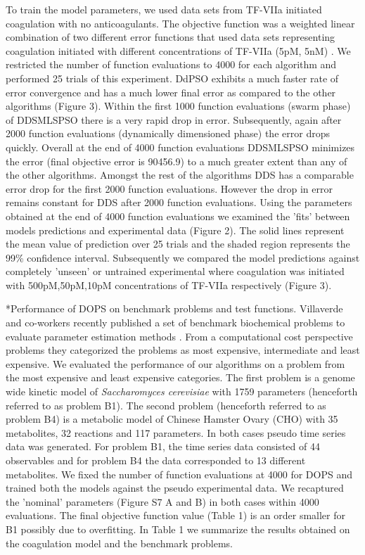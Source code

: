 \documentclass[12pt]{article}
\makeatletter
\renewcommand\subsection{\@startsection
	{subsection}{2}{0mm}
	{-0.05in}
	{-0.5\baselineskip}
	{\normalfont\normalsize\bfseries}}
\makeatother
\begin{document}
 To train the model parameters, we used data sets from TF-VIIa initiated coagulation with no anticoagulants. The objective function was a weighted linear combination of two different error functions that used data sets representing coagulation initiated with different concentrations of TF-VIIa (5pM, 5nM) \cite{hockin2002model}. We restricted the number of function evaluations to 4000 for each algorithm and performed 25 trials of this experiment. DdPSO exhibits a much faster rate of error convergence and has a much lower final error as compared to the other algorithms (Figure 3). Within the first 1000 function evaluations (swarm phase) of DDSMLSPSO there is a very rapid drop in error. Subsequently, again after 2000 function evaluations (dynamically dimensioned phase) the error drops quickly. Overall at the end of 4000 function evaluations DDSMLSPSO minimizes the error (final objective error is 90456.9) to a much greater extent than any of the other algorithms. Amongst the rest of the algorithms DDS has a comparable error drop for the first 2000 function evaluations. However the drop in error remains constant for DDS after 2000 function evaluations. Using the parameters obtained at the end of 4000 function evaluations we examined the 'fits' between models predictions and experimental data (Figure 2). The solid lines represent the mean value of prediction over 25 trials and the shaded region represents the 99\% confidence interval. Subsequently we compared the model predictions against completely 'unseen' or untrained experimental where coagulation was initiated with 500pM,50pM,10pM concentrations of TF-VIIa respectively (Figure 3).


\subsection*{Performance of DOPS on benchmark problems and test functions.}
Villaverde and co-workers recently published a set of benchmark biochemical problems to evaluate parameter estimation methods \cite{villaverde2015biopredyn}. From a computational cost perspective problems they categorized the problems as most expensive, intermediate and least expensive. We evaluated the performance of our algorithms on a problem from the most expensive and least expensive categories. The first problem is a genome wide kinetic model of \textit{Saccharomyces cerevisiae} with 1759 parameters (henceforth referred to as problem B1).  The second problem (henceforth referred to as problem B4) is a metabolic model of Chinese Hamster Ovary (CHO) with 35 metabolites, 32 reactions and 117 parameters. In both cases pseudo time series data was generated. For problem B1, the time series data consisted of 44 observables and for problem B4 the data corresponded to 13 different metabolites. We fixed the number of function evaluations at 4000 for DOPS and trained both the models against the pseudo experimental data. We recaptured the 'nominal' parameters (Figure S7 A and B)  in both cases within 4000 evaluations. The final objective function value (Table 1) is an order smaller for B1 possibly due to overfitting. In Table 1 we summarize the results obtained on the coagulation model and the benchmark problems.
\end{document}
